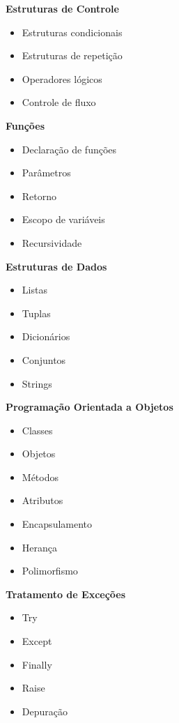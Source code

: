 \textbf{Estruturas de Controle}

\begin{itemize}
\item Estruturas condicionais
\item Estruturas de repetição
\item Operadores lógicos
\item Controle de fluxo
\end{itemize}

\textbf{Funções}

\begin{itemize}
\item Declaração de funções
\item Parâmetros
\item Retorno
\item Escopo de variáveis
\item Recursividade
\end{itemize}

\textbf{Estruturas de Dados}

\begin{itemize}
\item Listas
\item Tuplas
\item Dicionários
\item Conjuntos
\item Strings
\end{itemize}

\textbf{Programação Orientada a Objetos}

\begin{itemize}
\item Classes
\item Objetos
\item Métodos
\item Atributos
\item Encapsulamento
\item Herança
\item Polimorfismo
\end{itemize}

\textbf{Tratamento de Exceções}

\begin{itemize}
\item Try
\item Except
\item Finally
\item Raise
\item Depuração
\end{itemize}


